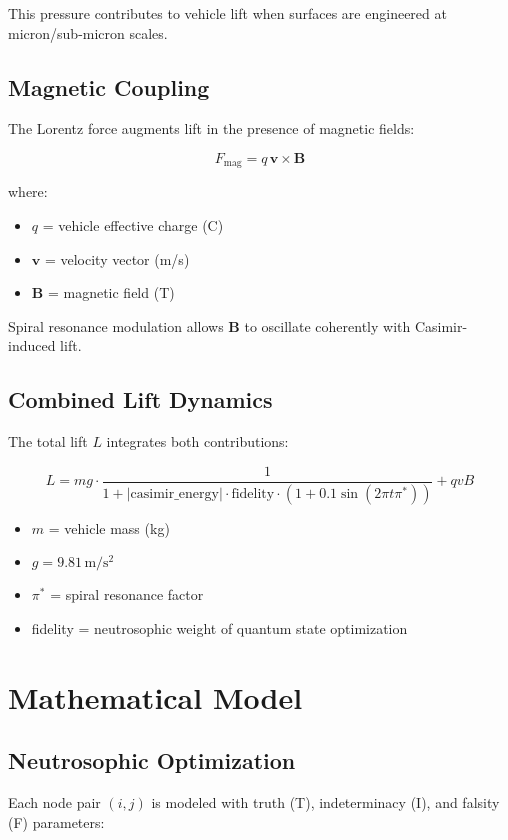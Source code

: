 \documentclass[12pt]{article}
\begin{document}
This pressure contributes to vehicle lift when surfaces are engineered at micron/sub-micron scales.

\subsection{Magnetic Coupling}
The Lorentz force augments lift in the presence of magnetic fields:

\[
F_\text{mag} = q \, \mathbf{v} \times \mathbf{B}
\]

where:
\begin{itemize}
    \item $q$ = vehicle effective charge (C)
    \item $\mathbf{v}$ = velocity vector (m/s)
    \item $\mathbf{B}$ = magnetic field (T)
\end{itemize}

Spiral resonance modulation allows $\mathbf{B}$ to oscillate coherently with Casimir-induced lift.

\subsection{Combined Lift Dynamics}
The total lift $L$ integrates both contributions:

\[
L = m g \cdot \frac{1}{1 + |\text{casimir\_energy}| \cdot \text{fidelity} \cdot \left(1 + 0.1 \sin(2 \pi t \pi^*)\right)} + q v B
\]

\begin{itemize}
    \item $m$ = vehicle mass (kg)
    \item $g = 9.81\, \mathrm{m/s^2}$
    \item $\pi^*$ = spiral resonance factor
    \item fidelity = neutrosophic weight of quantum state optimization
\end{itemize}

\section{Mathematical Model}

\subsection{Neutrosophic Optimization}
Each node pair $(i,j)$ is modeled with truth (T), indeterminacy (I), and falsity (F) parameters:
\end{document}
